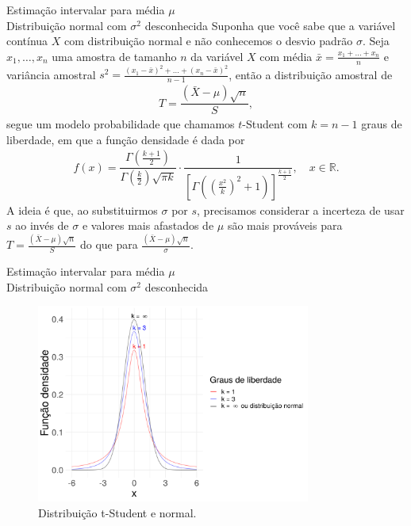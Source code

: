\documentclass[8pt]{beamer}
\begin{document}
\begin{frame}{Estimação intervalar para média $\mu$\\ Distribuição normal com $\sigma^2$ desconhecida}
	Suponha que você sabe que a variável contínua $X$ com distribuição normal e não conhecemos o desvio padrão $\sigma$. Seja $x_1, \dots, x_n$ uma amostra de tamanho $n$ da variável $X$ com média $\bar{x} = \frac{x_1 + \dots + x_n}{n}$ e variância amostral $s^2 = \frac{(x_1 - \bar{x})^2 + \dots + (x_n - \bar{x})^2}{n-1}$, então a distribuição amostral de
	\begin{align*}
		T = \dfrac{(\bar{X} - \mu)\sqrt{n}}{S},
	\end{align*}
	segue um modelo probabilidade que chamamos $t$-Student com $k=n-1$ graus de liberdade, em que a função densidade é dada por
	\begin{align*}
		f(x) = \dfrac{\Gamma\left(\frac{k + 1}{2}\right)}{\Gamma\left(\frac{k}{2}\right) \sqrt{\pi k}} \cdot \dfrac{1}{\left[ \Gamma\left(  \left( \frac{x^2}{k} \right)^2 + 1\right) \right]^{\frac{k+1}{2}}}, \quad x \in \mathbb{R}.
	\end{align*}
	A ideia é que, ao substituirmos $\sigma$ por $s$, precisamos considerar a incerteza de usar $s$ ao invés de $\sigma$ e valores mais afastados de $\mu$  são mais prováveis para $T=\frac{(\bar{X} - \mu)\sqrt{n}}{S}$ do que para  $\frac{(\bar{X} - \mu)\sqrt{n}}{\sigma}$. 
\end{frame}

\begin{frame}{Estimação intervalar para média $\mu$\\ Distribuição normal com $\sigma^2$ desconhecida}
	\begin{figure}[htbp]
		\centering
		\caption{Distribuição t-Student e normal.}
		\label{fig:t-student}
		\includegraphics[width=9cm]{t-student.png}
	\end{figure}

\end{frame}
\end{document}
